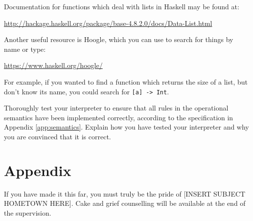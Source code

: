\documentclass[10pt,a4paper]{exam} %
\begin{document}
\begin{questions}
\begin{mdframed}
Documentation for functions which deal with lists in Haskell may be found at:

\url{http://hackage.haskell.org/package/base-4.8.2.0/docs/Data-List.html}

Another useful resource is Hoogle, which you can use to search for things by name or type:

\url{https://www.haskell.org/hoogle/}

For example, if you wanted to find a function which returns the size of a list, but don't know its name, you could search for \texttt{[a] -> Int}.

\end{mdframed}

\question Thoroughly test your interpreter to ensure that all rules in the operational semantics have been implemented correctly, according to the specification in Appendix \ref{app:semantics}. Explain how you have tested your interpreter and why you are convinced that it is correct.
\end{questions}

\newpage
\appendix
\section{Appendix}




{\tiny If you have made it this far, you must truly be the pride of [INSERT SUBJECT HOMETOWN HERE]. Cake and grief counselling will be available at the end of the supervision.}
\end{document}
